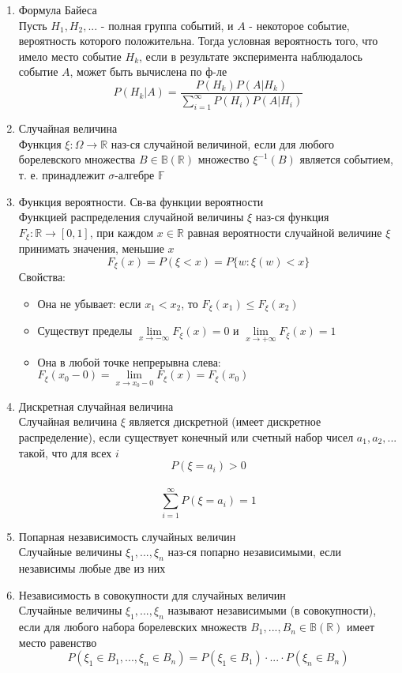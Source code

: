 \documentclass[a4paper, 12pt]{article}
\begin{document}
\begin{enumerate}
    \item Формула Байеса\\
    Пусть $H_1,H_2,...$ - полная группа событий, и $A$ - некоторое событие, вероятность которого положительна. Тогда условная вероятность того, что имело место событие $H_k$, если в результате эксперимента наблюдалось событие $A$, может быть вычислена по ф-ле
    \[ P(H_k|A)=\frac{P(H_k)P(A|H_k)}{\sum\limits_{i=1}^{\infty} P(H_i)P(A|H_i)} \]
    
    \item Случайная величина\\
    Функция $\xi:\Omega\rightarrow\mathbb{R}$ наз-ся случайной величиной, если для любого борелевского множества $B\in\mathbb{B}(\mathbb{R})$ множество $\xi^{-1}(B)$ является событием, т. е. принадлежит $\sigma$-алгебре $\mathbb{F}$
    
    \item Функция вероятности. Св-ва функции вероятности\\
    Функцией распределения случайной величины $\xi$ наз-ся функция $F_\xi:\mathbb{R}\rightarrow[0,1]$, при каждом $x\in\mathbb{R}$ равная вероятности случайной величине $\xi$ принимать значения, меньшие $x$
    \[F_\xi(x)=P(\xi<x)=P\{w:\xi(w)<x\} \]
    Свойства: \begin{itemize}
        \item Она не убывает: если $x_1<x_2$, то $F_\xi(x_1)\leq F_\xi(x_2)$
        \item Существут пределы $\lim\limits_{x\rightarrow -\infty} F_\xi(x)=0$ и $\lim\limits_{x\rightarrow +\infty} F_\xi(x)=1$
        \item Она в любой точке непрерывна слева: $F_\xi(x_0-0)=\lim\limits_{x\rightarrow x_0-0} F_\xi(x)=F_\xi(x_0)$
    \end{itemize}
    
    \item Дискретная случайная величина\\
    Случайная величина $\xi$ является дискретной (имеет дискретное распределение), если существует конечный или счетный набор чисел $a_1,a_2,...$ такой, что для всех $i$
    \[ P(\xi=a_i)>0\]\, \[ \sum\limits_{i=1}^{\infty} P(\xi=a_i)=1\]
    
    \item Попарная независимость случайных величин\\
    Случайные величины $\xi_1,...,\xi_n$ наз-ся попарно независимыми, если независимы любые две из них
    
    \item Независимость в совокупности для случайных величин\\
    Случайные величины $\xi_1,...,\xi_n$ называют независимыми (в совокупности), если для любого набора борелевских множеств $B_1,...,B_n\in \mathbb{B}(\mathbb{R})$ имеет место равенство
    \[ P(\xi_1 \in B_1,...,\xi_n \in B_n)=P(\xi_1\in B_1)\cdot...\cdot P(\xi_n\in B_n)\]
    

\end{enumerate}
\end{document}
